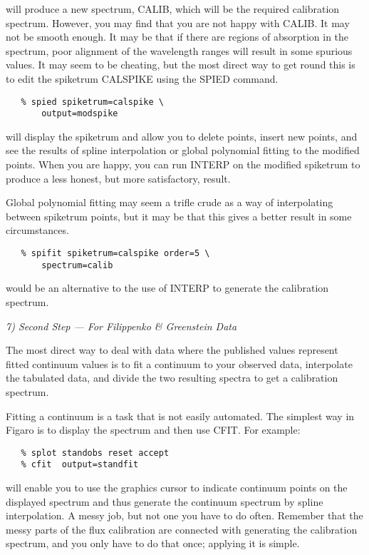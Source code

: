 will produce a new spectrum, CALIB, which will be the required calibration
spectrum.  However, you may find that you are not happy with CALIB.  It
may not be smooth enough.  It may be that if there are regions of absorption
in the spectrum, poor alignment of the wavelength ranges will result in
some spurious values.  It may seem to be cheating, but the most direct
way to get round this is to edit the spike\-trum CALSPIKE using the SPIED
command.

\begin{verbatim}
   % spied spiketrum=calspike \
       output=modspike
\end{verbatim}

will display the spike\-trum and allow you to delete points, insert new points,
and see the results of spline interpolation or global polynomial fitting to
the modified points.  When you are happy, you can run INTERP on the
modified spike\-trum to produce a less honest, but more satisfactory, result.

Global polynomial fitting may seem a trifle crude as a way of interpolating
between spike\-trum points, but it may be that this gives a better result in
some circumstances.

\begin{verbatim}
   % spifit spiketrum=calspike order=5 \
       spectrum=calib
\end{verbatim}

would be an alternative to the use of INTERP to generate the calibration
spectrum.


\goodbreak
\vspace{12pt}
{\it 7) Second Step --- For Filippenko \& Greenstein Data}

The most direct way to deal with data where the published values
represent fitted continuum values is to fit a continuum to your observed
data, interpolate the tabulated data, and divide the two resulting spectra
to get a calibration spectrum.

Fitting a continuum is a task that is not easily automated.  The
simplest way in Figaro is to display the spectrum and then use CFIT.
For example:

\begin{verbatim}
   % splot standobs reset accept
   % cfit  output=standfit
\end{verbatim}

will enable you to use the graphics cursor to indicate continuum points
on the displayed spectrum and thus generate the continuum spectrum by
spline interpolation.  A messy job, but not one you have to do often.
Remember that the messy parts of the flux calibration are connected
with generating the calibration spectrum, and you only have to do that
once; applying it is simple.

